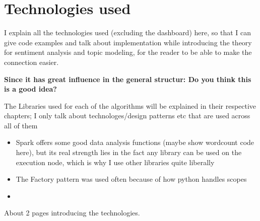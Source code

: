 
\chapter{Technologies used}

\label{ch:technologiesUsed}

I explain all the technologies used (excluding the dashboard) here, so that I can give code examples and talk about implementation
while introducing the theory for sentiment analysis and topic modeling, for the reader to be able to make the connection easier.

\textbf{Since it has great influence in the general structur: Do you think this is a good idea?}

The Libraries used for each of the algorithms will be explained in their respective chapters;
I only talk about technologes/design patterns etc that are used across all of them

\begin{itemize}
    \item
    Spark offers some good data analysis functions (maybe show wordcount code here), but its real strength lies in the fact any library can be used on the execution node, which is why I use other libraries quite liberally
    \item
    The Factory pattern was used often because of how python handles scopes
    \item

\end{itemize}

About 2 pages introducing the technologies.

\pagebreak[2]